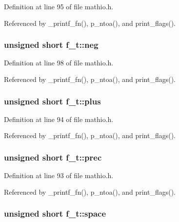Definition at line 95 of file mathio.\+h.



Referenced by \+\_\+printf\+\_\+fn(), p\+\_\+ntoa(), and print\+\_\+flags().

\subsubsection[{\texorpdfstring{neg}{neg}}]{\setlength{\rightskip}{0pt plus 5cm}unsigned short f\+\_\+t\+::neg}\hypertarget{unionf__t_a08d5e77f0fdb784ab1ef1425625e23f7}{}\label{unionf__t_a08d5e77f0fdb784ab1ef1425625e23f7}


Definition at line 98 of file mathio.\+h.



Referenced by \+\_\+printf\+\_\+fn(), p\+\_\+ntoa(), and print\+\_\+flags().

\subsubsection[{\texorpdfstring{plus}{plus}}]{\setlength{\rightskip}{0pt plus 5cm}unsigned short f\+\_\+t\+::plus}\hypertarget{unionf__t_a63ebe04d55417685e439b779dfa8dafe}{}\label{unionf__t_a63ebe04d55417685e439b779dfa8dafe}


Definition at line 94 of file mathio.\+h.



Referenced by \+\_\+printf\+\_\+fn(), p\+\_\+ntoa(), and print\+\_\+flags().

\subsubsection[{\texorpdfstring{prec}{prec}}]{\setlength{\rightskip}{0pt plus 5cm}unsigned short f\+\_\+t\+::prec}\hypertarget{unionf__t_afd9cfffafc044b616256b483e5444d92}{}\label{unionf__t_afd9cfffafc044b616256b483e5444d92}


Definition at line 93 of file mathio.\+h.



Referenced by \+\_\+printf\+\_\+fn(), p\+\_\+ntoa(), and print\+\_\+flags().

\subsubsection[{\texorpdfstring{space}{space}}]{\setlength{\rightskip}{0pt plus 5cm}unsigned short f\+\_\+t\+::space}\hypertarget{unionf__t_aba20a97e95d14a076e9c175989022717}{}\label{unionf__t_aba20a97e95d14a076e9c175989022717}


